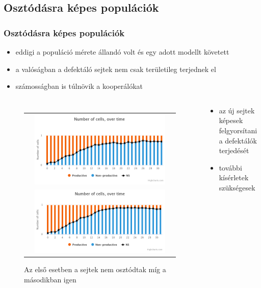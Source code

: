 \subsection{Osztódásra képes populációk}
\begin{frame}
	\frametitle{Osztódásra képes populációk}
	\begin{itemize}
		\item eddigi a populáció mérete állandó volt és egy adott modellt követett
		\item a valóságban a defektáló sejtek nem csak területileg terjednek el
		\item számosságban is túlnövik a kooperálókat
	\end{itemize}
	
	\begin{columns}
			\begin{figure}[ht]
				\centering
				\begin{tabular}{c}
					\includegraphics[width=0.9\textwidth]{images/nemosztodik}
					\\
					\includegraphics[width=0.9\textwidth]{images/osztodik}
				\end{tabular}
				\caption{Az első esetben a sejtek nem osztódtak míg a másodikban igen}				\label{fig:Divide}
			\end{figure}
			\begin{block}{}
				\begin{itemize}
					\item az új sejtek képesek felgyorsítani a defektálók terjedését
					\item további kísérletek szükségesek
				\end{itemize}
			\end{block}
	\end{columns}
\end{frame}

